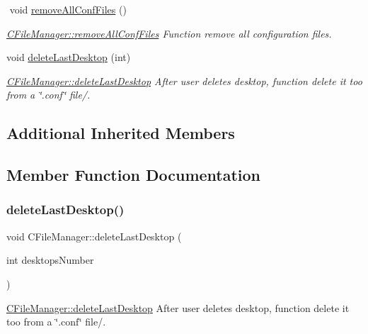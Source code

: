\begin{DoxyCompactItemize}
$$\mbox{\label{classCFileManager_af287e5f6ee249c61088dd612923668df}} 
void \hyperlink{classCFileManager_af287e5f6ee249c61088dd612923668df}{remove\+All\+Conf\+Files} ()
\begin{DoxyCompactList}\small\item\em \hyperlink{classCFileManager_af287e5f6ee249c61088dd612923668df}{C\+File\+Manager\+::remove\+All\+Conf\+Files} Function remove all configuration files. \end{DoxyCompactList}\item 
void \hyperlink{classCFileManager_adb18dc95333090e9b1aff84fb9a98920}{delete\+Last\+Desktop} (int)
\begin{DoxyCompactList}\small\item\em \hyperlink{classCFileManager_adb18dc95333090e9b1aff84fb9a98920}{C\+File\+Manager\+::delete\+Last\+Desktop} After user deletes desktop, function delete it too from a \char`\"{}.\+conf\char`\"{} file/. \end{DoxyCompactList}\end{DoxyCompactItemize}
\subsection*{Additional Inherited Members}


\subsection{Member Function Documentation}
\mbox{\label{classCFileManager_adb18dc95333090e9b1aff84fb9a98920}} 
\subsubsection{\texorpdfstring{delete\+Last\+Desktop()}{deleteLastDesktop()}}
{\footnotesize\ttfamily void C\+File\+Manager\+::delete\+Last\+Desktop (\begin{DoxyParamCaption}\item[{int}]{desktops\+Number }\end{DoxyParamCaption})\hspace{0.3cm}{\ttfamily [virtual]}}



\hyperlink{classCFileManager_adb18dc95333090e9b1aff84fb9a98920}{C\+File\+Manager\+::delete\+Last\+Desktop} After user deletes desktop, function delete it too from a \char`\"{}.\+conf\char`\"{} file/. 


